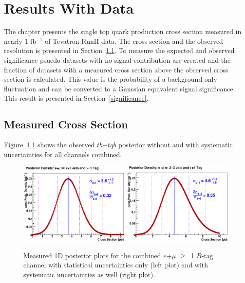 \chapter{Results With Data}
\label{observedresults}
\label{results}

The chapter presents the single top quark production cross section measured in nearly 1 fb$^{-1}$ of Tevatron RunII data. The cross section and the observed resolution is presented in Section~\ref{measured}. To measure the expected and observed significance psuedo-datasets with no signal contribution are created and the fraction of datasets with a measured cross section above the observed cross section is calculated. This value is the probability of a background-only fluctuation and can be converted to a Gaussian equivalent signal significance. This result is presented in Section~\ref{significance}.


\section{Measured Cross Section}
\label{measured}

Figure~\ref{meas-post-1d} shows the observed $tb$+$tqb$ posterior
without and with systematic uncertainties for all channels combined.

\begin{figure}[!h!tbp]
\includegraphics[width=0.49\textwidth]{eps/MatrixElement/posterior/nosys/limit_TBTQ_LeptonsCombined_JetsCombined_TagsCombined.eps}
\includegraphics[width=0.49\textwidth]{eps/MatrixElement/posterior/sys/limit_TBTQ_LeptonsCombined_JetsCombined_TagsCombined.eps}
\vspace{-0.1in}
\caption{Measured 1D posterior plots for the combined
$e$+$\mu$ $\geq$~1 $B$-tag channel with statistical uncertainties only
(left plot) and with systematic uncertainties as well (right plot).}
\label{meas-post-1d}
\end{figure}

